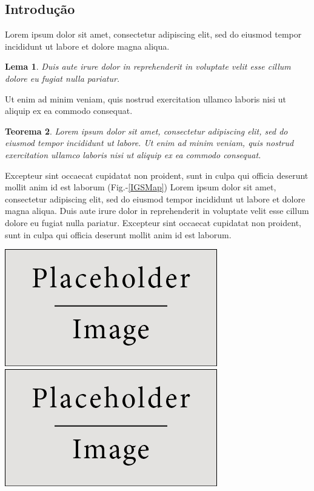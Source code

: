 \documentclass[a0,portrait]{a0poster}
\newtheorem{theorem}{Teorema}
\newtheorem{lemma}[theorem]{Lema}
\begin{document}
\begin{minipage}[c]{\linewidth}
\begin{framed}
\begin{multicols}{2}
\section*{Introdução}
Lorem ipsum dolor sit amet, consectetur adipiscing elit, sed do eiusmod tempor incididunt ut labore et dolore magna aliqua. 
\begin{mybox}
\begin{lemma}
Duis aute irure dolor in reprehenderit in voluptate velit esse cillum dolore eu fugiat nulla pariatur. 
\end{lemma}
\end{mybox}
Ut enim ad minim veniam, quis nostrud exercitation ullamco laboris nisi ut aliquip ex ea commodo consequat.
\begin{mybox}
\begin{theorem}
Lorem ipsum dolor sit amet, consectetur adipiscing elit, sed do eiusmod tempor incididunt ut labore. Ut enim ad minim veniam, quis nostrud exercitation ullamco laboris nisi ut aliquip ex ea commodo consequat.
\end{theorem}
\end{mybox}
Excepteur sint occaecat cupidatat non proident, sunt in culpa qui officia deserunt mollit anim id est laborum (Fig.-\ref{IGSMap}) Lorem ipsum dolor sit amet, consectetur adipiscing elit, sed do eiusmod tempor incididunt ut labore et dolore magna aliqua.  Duis aute irure dolor in reprehenderit in voluptate velit esse cillum dolore eu fugiat nulla pariatur. Excepteur sint occaecat cupidatat non proident, sunt in culpa qui officia deserunt mollit anim id est laborum.\\
\begin{center}
\hspace*{\fill}
\includegraphics[width=0.49\linewidth]{figures/placeholder}
\includegraphics[width=0.49\linewidth]{figures/placeholder}

\end{center}
\end{multicols}
\end{framed}
\end{minipage}
\end{document}
